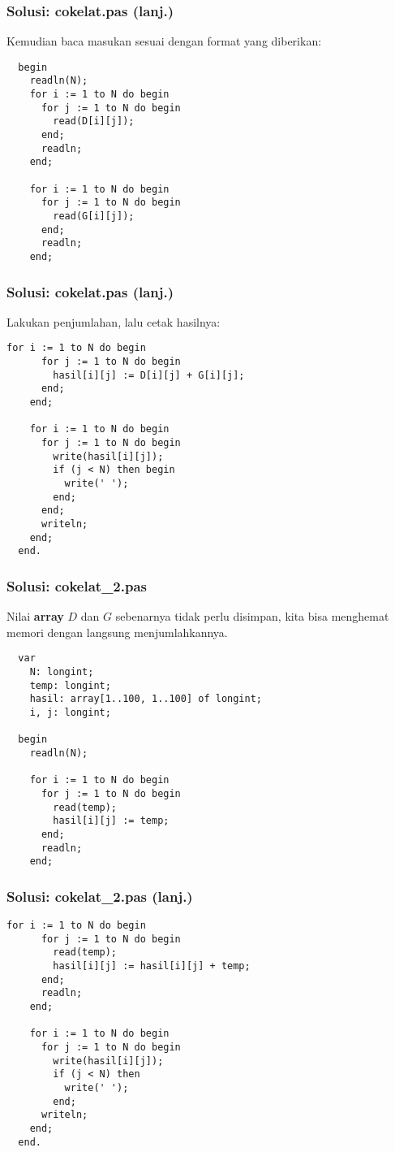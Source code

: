 \begin{frame}[fragile]
\frametitle{Solusi: cokelat.pas (lanj.)}
Kemudian baca masukan sesuai dengan format yang diberikan:
\begin{lstlisting}
  begin
    readln(N);
    for i := 1 to N do begin
      for j := 1 to N do begin
        read(D[i][j]);
      end;
      readln;
    end;

    for i := 1 to N do begin
      for j := 1 to N do begin
        read(G[i][j]);
      end;
      readln;
    end;
\end{lstlisting}
\end{frame}

\begin{frame}[fragile]
\frametitle{Solusi: cokelat.pas (lanj.)}
Lakukan penjumlahan, lalu cetak hasilnya:
\begin{lstlisting}[gobble=2]
    for i := 1 to N do begin
      for j := 1 to N do begin
        hasil[i][j] := D[i][j] + G[i][j];
      end;
    end;

    for i := 1 to N do begin
      for j := 1 to N do begin
        write(hasil[i][j]);
        if (j < N) then begin
          write(' ');
        end;
      end;
      writeln;
    end;
  end.
\end{lstlisting}
\end{frame}

\begin{frame}[fragile]
\frametitle{Solusi: cokelat\_2.pas}
Nilai \textbf{array} $D$ dan $G$ sebenarnya tidak perlu disimpan, kita bisa menghemat memori dengan langsung menjumlahkannya.
\begin{lstlisting}
  var
    N: longint;
    temp: longint;
    hasil: array[1..100, 1..100] of longint;
    i, j: longint;

  begin
    readln(N);

    for i := 1 to N do begin
      for j := 1 to N do begin
        read(temp);
        hasil[i][j] := temp;
      end;
      readln;
    end;
\end{lstlisting}
\end{frame}

\begin{frame}[fragile]
\frametitle{Solusi: cokelat\_2.pas (lanj.)}
\begin{lstlisting}[gobble=2]
    for i := 1 to N do begin
      for j := 1 to N do begin
        read(temp);
        hasil[i][j] := hasil[i][j] + temp;
      end;
      readln;
    end;

    for i := 1 to N do begin
      for j := 1 to N do begin
        write(hasil[i][j]);
        if (j < N) then
          write(' ');
        end;
      writeln;
    end;
  end.
\end{lstlisting}
\end{frame}

